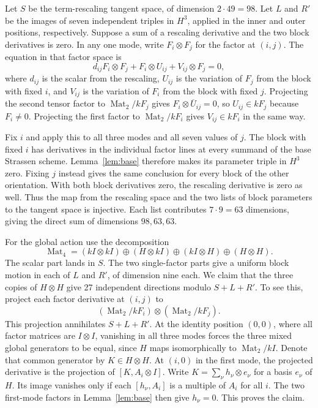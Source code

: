 \documentclass[11pt]{amsart}
\begin{document}
Let $S$ be the term-rescaling tangent space, of dimension $2\cdot49=98$.
Let $L$ and $R'$ be the images of seven independent triples in $H^3$,
applied in the inner and outer positions, respectively. Suppose a
sum of a rescaling derivative and the two block derivatives is zero.
In any one mode, write $F_i\otimes F_j$ for the factor at $(i,j)$.
The equation in that factor space is
\[
 d_{ij} F_i\otimes F_j + F_i\otimes U_{ij} + V_{ij}\otimes F_j=0,
\]
where $d_{ij}$ is the scalar from the rescaling, $U_{ij}$ is the
variation of $F_j$ from the block with fixed $i$, and $V_{ij}$ is
the variation of $F_i$ from the block with fixed $j$.
Projecting the second tensor factor to
$\operatorname{Mat}_2/kF_j$ gives $F_i\otimes\overline U_{ij}=0$,
so $U_{ij}\in kF_j$ because $F_i\ne0$. Projecting the first factor
to $\operatorname{Mat}_2/kF_i$ gives $V_{ij}\in kF_i$ in the
same way.

Fix $i$ and apply this to all three modes and all seven values of
$j$. The block with fixed $i$ has derivatives in the individual
factor lines at every summand of the base Strassen scheme.
Lemma~\ref{lem:base} therefore makes its parameter triple in $H^3$
zero. Fixing $j$ instead gives the same conclusion for every block
of the other orientation. With both block derivatives zero, the
rescaling derivative is zero as well. Thus the map from the
rescaling space and the two lists of block parameters to the
tangent space is injective. Each list contributes $7\cdot9=63$
dimensions, giving the direct sum of dimensions $98,63,63$.

For the global action use the decomposition
\[
 \operatorname{Mat}_4
   =(kI\otimes kI)\oplus (H\otimes kI)
     \oplus(kI\otimes H)\oplus(H\otimes H).
\]
The scalar part lands in $S$. The two single-factor parts give a
uniform block motion in each of $L$ and $R'$, of dimension nine each.
We claim that the three copies of $H\otimes H$ give 27 independent
directions modulo $S+L+R'$. To see this, project each factor derivative
at $(i,j)$ to
\[
 (\operatorname{Mat}_2/kF_i)\otimes
 (\operatorname{Mat}_2/kF_j).
\]
This projection annihilates $S+L+R'$. At the identity position
$(0,0)$, where all factor matrices are $I\otimes I$, vanishing in
all three modes forces the three mixed global generators to be
equal, since $H$ maps isomorphically to $\operatorname{Mat}_2/kI$.
Denote that common generator by $K\in H\otimes H$. At $(i,0)$ in
the first mode, the projected derivative is the projection of
$[K,A_i\otimes I]$. Write $K=\sum_\nu h_\nu\otimes e_\nu$ for
a basis $e_\nu$ of $H$. Its image vanishes only if each
$[h_\nu,A_i]$ is a multiple of $A_i$ for all $i$. The two
first-mode factors in Lemma~\ref{lem:base} then give $h_\nu=0$.
This proves the claim.
\end{document}
